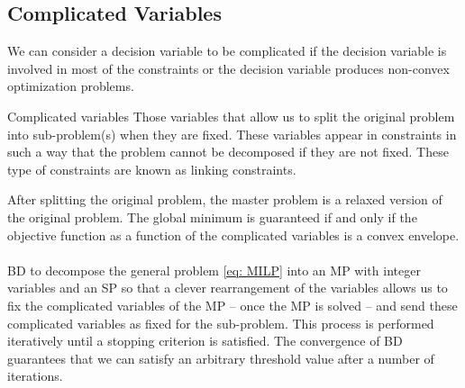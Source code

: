 \subsection{Complicated Variables}
We can consider a decision variable to be complicated if the decision variable is involved in most of the constraints or the decision variable produces non-convex optimization problems. 
\begin{definition}{}{Complicated variables}
Those variables that allow us to split the original problem into sub-problem(s) when they are fixed. These variables appear in constraints in such a way that the problem cannot be decomposed if they are not fixed. These type of constraints are known as linking constraints. 
\end{definition}
After splitting the original problem, the master problem is a relaxed version of the original problem. The global minimum is guaranteed if and only if the objective function as a function of the complicated variables is a convex envelope.\\\\
BD to decompose the general problem \eqref{eq: MILP} into an MP with integer variables and an SP so that a clever rearrangement of the variables allows us to fix the complicated variables of the MP -- once the MP is solved -- and send these complicated variables as fixed for the sub-problem. This process is performed iteratively until a stopping criterion is satisfied. The convergence of BD\,\cite{Sahinidis1991BDConvergence} guarantees that we can satisfy an arbitrary threshold value after a number of iterations. 
